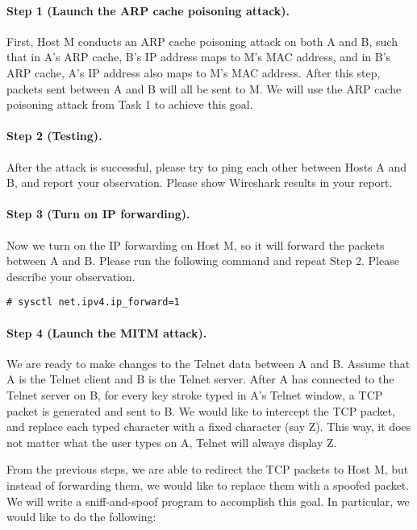 \paragraph{Step 1 (Launch the ARP cache poisoning attack).} First, Host M conducts an ARP cache
poisoning attack on both A and B, such that in A's ARP cache, B's IP address maps to M's MAC
address, and in B's ARP cache, A's IP address also maps to M's MAC address. After this step,
packets sent between A and B will all be sent to M. We will use the ARP cache poisoning attack
from Task 1 to achieve this goal. 


\paragraph{Step 2 (Testing).} After the attack is successful, please try to ping each other
between Hosts A and B, and report your observation. Please show Wireshark results in your
report.

\paragraph{Step 3 (Turn on IP forwarding).} Now we turn on the IP forwarding on Host M, so it
will forward the packets between A and B. Please run the following command and repeat Step 2.
Please describe your observation. 

\begin{lstlisting}
# sysctl net.ipv4.ip_forward=1
\end{lstlisting}

\paragraph{Step 4 (Launch the MITM attack).} We are ready to make changes to the Telnet data
between A and B. Assume that A is the Telnet client and B is the Telnet server. After A has
connected to the Telnet server on B, for every key stroke typed in A's Telnet window, a TCP
packet is generated and sent to B. We would like to intercept the TCP packet, and replace each
typed character with a fixed character (say Z). This way, it does not matter what the user
types on A, Telnet will always display Z.

From the previous steps, we are able to redirect the TCP packets to Host M, but instead of
forwarding them, we would like to replace them with a spoofed packet. We will write a
sniff-and-spoof program to accomplish this goal. In particular, we would like to do the
following: 


